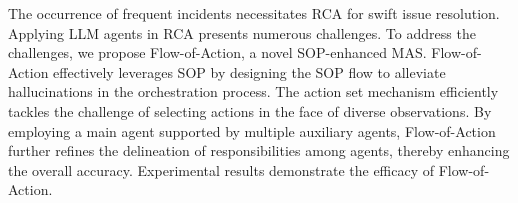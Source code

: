 The occurrence of frequent incidents necessitates RCA for swift issue resolution. Applying LLM agents in RCA presents numerous challenges. To address the challenges, we propose Flow-of-Action, a novel SOP-enhanced MAS. Flow-of-Action effectively leverages SOP by designing the SOP flow to alleviate hallucinations in the orchestration process. The action set mechanism efficiently tackles the challenge of selecting actions in the face of diverse observations. By employing a main agent supported by multiple auxiliary agents, Flow-of-Action further refines the delineation of responsibilities among agents, thereby enhancing the overall accuracy. Experimental results demonstrate the efficacy of Flow-of-Action.
